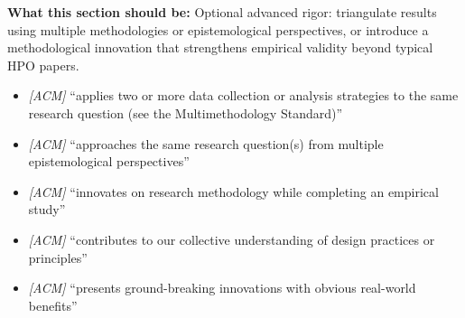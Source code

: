 \noindent\textbf{What this section should be:}
Optional advanced rigor: triangulate results using multiple methodologies or epistemological perspectives, or introduce a methodological innovation that strengthens empirical validity beyond typical HPO papers.
\begin{itemize}
  \item \textit{[ACM]} ``applies two or more data collection or analysis strategies to the same research question (see the Multimethodology Standard)''
  \item \textit{[ACM]} ``approaches the same research question(s) from multiple epistemological perspectives''
  \item \textit{[ACM]} ``innovates on research methodology while completing an empirical study''
  \item \textit{[ACM]} ``contributes to our collective understanding of design practices or principles''
  \item \textit{[ACM]} ``presents ground-breaking innovations with obvious real-world benefits''
\end{itemize}